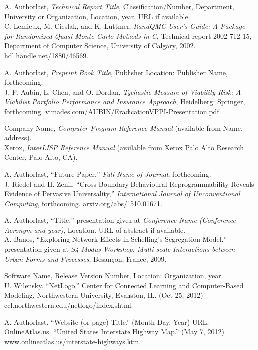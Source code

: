 \documentclass{article}
\begin{document}
\begin{thebibliography}{99}
A. Authorlast, \textit{Technical Report Title}, Classification/Number,
Department, University or Organization, Location, year. URL if
available.\\
C. Lemieux, M. Cieslak, and K. Luttmer, \textit{RandQMC User's
Guide: A Package for Randomized Quasi-Monte Carlo Methods in C},
Technical report 2002-712-15, Department of Computer Science,
University of Calgary, 2002. hdl.handle.net/1880/46569.

A. Authorlast, \textit{Preprint Book Title}, Publisher Location:
Publisher Name, forthcoming. \\
J.-P. Aubin, L. Chen, and O. Dordan, \textit{Tychastic Measure of
Viability Risk: A Viabilist Portfolio Performance and Insurance
Approach}, Heidelberg: Springer, forthcoming. 
vimades.com/AUBIN/EradicationVPPI-Presentation.pdf.

Company Name, \textit{Computer Program Reference Manual} (available from Name, address). \\
Xerox, \textit{InterLISP Reference Manual} (available from Xerox
Palo Alto Research Center, Palo Alto, CA).

A. Authorlast, ``Future Paper,'' \textit{Full Name of Journal}, forthcoming.\\ 
J. Riedel and H. Zenil, ``Cross-Boundary Behavioural Reprogrammability Reveals Evidence of Pervasive Universality,'' \textit{ International Journal of Unconventional Computing}, forthcoming. arxiv.org/abs/1510.01671.

A. Authorlast, ``Title,'' presentation given at \textit{Conference
Name (Conference Acronym and year)}, Location. URL of abstract if
available.\\
A. Banos, ``Exploring Network Effects in Schelling's Segregation
Model,'' presentation given at \textit{S4-Modus Workshop: Multi-scale
Interactions between Urban Forms and Processes}, Besan{\c c}on,
France, 2009.

Software Name, Release Version Number, Location: Organization, year.\\
U. Wilensky. ``NetLogo.'' Center for Connected Learning and
Computer-Based Modeling, Northwestern University, Evanston, IL.
(Oct 25, 2012) ccl.northwestern.edu/netlogo/index.shtml.

A. Authorlast. ``Website (or page) Title.'' (Month Day, Year) URL.\\
OnlineAtlas.us. ``United States Interstate Highway Map.'' (May 7,
2012) www.onlineatlas.us/interstate-highways.htm.


\end{thebibliography}
\end{document}
